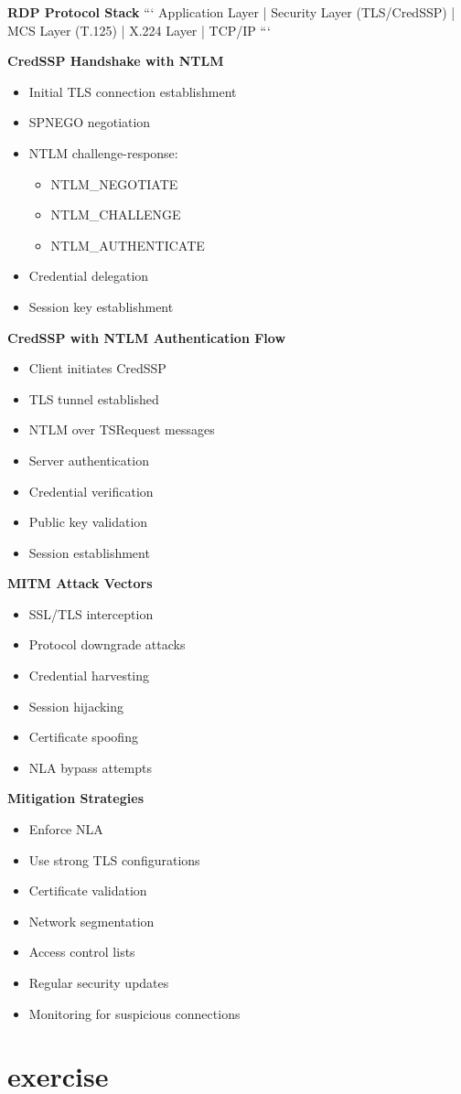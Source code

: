 \textbf{RDP Protocol Stack}
```
Application Layer
    |
Security Layer (TLS/CredSSP)
    |
MCS Layer (T.125)
    |
X.224 Layer
    |
TCP/IP
```

\textbf{CredSSP Handshake with NTLM}
\begin{itemize}
    \item Initial TLS connection establishment
    \item SPNEGO negotiation
    \item NTLM challenge-response:
        \begin{itemize}
            \item NTLM\_NEGOTIATE
            \item NTLM\_CHALLENGE
            \item NTLM\_AUTHENTICATE
        \end{itemize}
    \item Credential delegation
    \item Session key establishment
\end{itemize}

\textbf{CredSSP with NTLM Authentication Flow}
\begin{itemize}
    \item Client initiates CredSSP
    \item TLS tunnel established
    \item NTLM over TSRequest messages
    \item Server authentication
    \item Credential verification
    \item Public key validation
    \item Session establishment
\end{itemize}

\textbf{MITM Attack Vectors}
\begin{itemize}
    \item SSL/TLS interception
    \item Protocol downgrade attacks
    \item Credential harvesting
    \item Session hijacking
    \item Certificate spoofing
    \item NLA bypass attempts
\end{itemize}

\textbf{Mitigation Strategies}
\begin{itemize}
    \item Enforce NLA
    \item Use strong TLS configurations
    \item Certificate validation
    \item Network segmentation
    \item Access control lists
    \item Regular security updates
    \item Monitoring for suspicious connections
\end{itemize}

\section{exercise}
